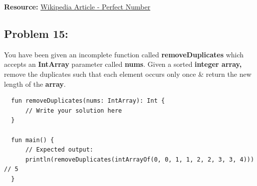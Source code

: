 \documentclass{article}
\begin{document}
\textbf{Resource:} \href{https://en.wikipedia.org/wiki/Perfect_number}{Wikipedia Article - Perfect Number}

\subsection*{Problem 15:}
You have been given an incomplete function called \textbf{removeDuplicates} which accepts an \textbf{IntArray} parameter called \textbf{nums}. Given a sorted \textbf{integer array,} remove the duplicates such that each element occurs only once \& return the new length of the \textbf{array}.

\begin{verbatim}
  fun removeDuplicates(nums: IntArray): Int {
      // Write your solution here  
  }

  fun main() {
      // Expected output:
      println(removeDuplicates(intArrayOf(0, 0, 1, 1, 2, 2, 3, 3, 4))) // 5
  }
\end{verbatim}
\end{document}
